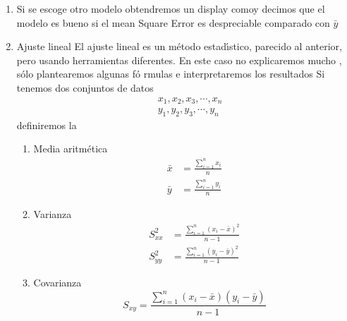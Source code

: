 \documentclass{article}
\begin{document}
\begin{enumerate}
\begin{enumerate}
\begin{enumerate}
\item Si se escoge otro modelo obtendremos un display comoy decimos
que el modelo es bueno si el mean Square Error es despreciable comparado con 
$\bar{y}$ %

\item Ajuste lineal\newline
El ajuste lineal es un m\'{e}todo estad\'{\i}stico, parecido al anterior,
pero usando herramientas diferentes.\newline
En este caso no explicaremos mucho , s\'{o}lo plantearemos algunas f\'{o}%
rmulas e interpretaremos los resultados \newline
Si tenemos dos conjuntos de datos 
\begin{align*}
& x_{1},x_{2},x_{3},\cdots,x_{n} \\
& y_{1},y_{2},y_{3},\cdots,y_{n}
\end{align*}
definiremos la

\begin{enumerate}
\item Media aritm\'{e}tica 
\begin{align*}
\bar{x} & =\frac{\sum_{i=1}^{n}x_{i}}{n} \\
\bar{y} & =\frac{\sum_{i=1}^{n}y_{i}}{n}
\end{align*}

\item Varianza 
\begin{align*}
S_{xx}^{2} & =\frac{\sum_{i=1}^{n}(x_{i}-\bar{x})^{2}}{n-1} \\
S_{yy}^{2} & =\frac{\sum_{i=1}^{n}(y_{i}-\bar{y})^{2}}{n-1}
\end{align*}

\item Covarianza 
\begin{equation*}
S_{xy}=\frac{\sum_{i=1}^{n}(x_{i}-\bar{x})(y_{i}-\bar{y})}{n-1}
\end{equation*}


\end{enumerate}
\end{enumerate}
\end{enumerate}
\end{enumerate}
\end{document}
